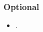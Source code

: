 \documentclass[abstract=on,parskip=full,headings=standardclasses,fontsize=11pt,paper=a4]{scrartcl}
\begin{document}
\subsubsection*{Optional}
\begin{itemize}
\item {}.
\end{itemize}







\sloppy
\renewcommand*{\bibfont}{\small}

\setlength{\bibitemsep}{0.2em} %

\bigskip

\end{document}
